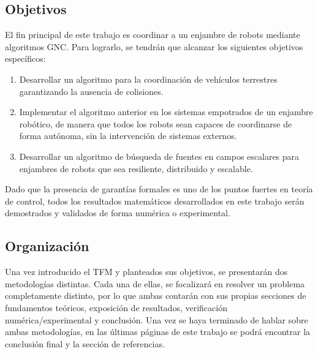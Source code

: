 
\subsection{Objetivos}

El fin principal de este trabajo es coordinar a un enjambre de robots mediante algoritmos GNC. Para lograrlo, se tendrán que alcanzar los siguientes objetivos específicos:

\begin{enumerate}
    \setlength\itemsep{1em}

    \item Desarrollar un algoritmo para la coordinación de vehículos terrestres garantizando la ausencia de colisiones.
    
    \item Implementar el algoritmo anterior en los sistemas empotrados de un enjambre robótico, de manera que todos los robots sean capaces de coordinarse de forma autónoma, sin la intervención de sistemas externos. %

    \item Desarrollar un algoritmo de búsqueda de fuentes en campos escalares para enjambres de robots que sea resiliente, distribuido y escalable.
\end{enumerate}

Dado que la presencia de garantías formales es uno de los puntos fuertes en teoría de control, todos los resultados matemáticos desarrollados en este trabajo serán demostrados y validados de forma numérica o experimental. 


\subsection{Organización}

Una vez introducido el TFM y planteados sus objetivos, se presentarán dos metodologías distintas. Cada una de ellas, se focalizará en resolver un problema completamente distinto, por lo que ambas contarán con sus propias secciones de fundamentos teóricos, exposición de resultados, verificación numérica/experimental y conclusión. Una vez se haya terminado de hablar sobre ambas metodologías, en las últimas páginas de este trabajo se podrá encontrar la conclusión final y la sección de referencias.

